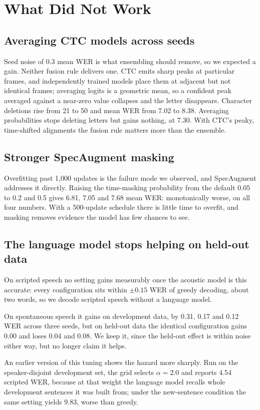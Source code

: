 \section{What Did Not Work}
\label{sec:negative}

\subsection{Averaging CTC models across seeds}


Seed noise of 0.3 mean WER is what ensembling should remove, so we expected a
gain. Neither fusion rule delivers one. CTC emits sharp peaks at particular
frames, and independently trained models place them at adjacent but not
identical frames; averaging logits is a geometric mean, so a confident peak
averaged against a near-zero value collapses and the letter disappears.
Character deletions rise from 21 to 50 and mean WER from 7.02 to 8.38.
Averaging probabilities stops deleting letters but gains nothing, at 7.30. With
CTC's peaky, time-shifted alignments the fusion rule matters more than the
ensemble.

\subsection{Stronger SpecAugment masking}

Overfitting past 1{,}000 updates is the failure mode we observed, and
SpecAugment \cite{park2019specaugment} addresses it directly. Raising the
time-masking probability from the default 0.05 to 0.2 and 0.5 gives 6.81, 7.05
and 7.68 mean WER: monotonically worse, on all four numbers. With a 500-update
schedule there is little time to overfit, and masking removes evidence the
model has few chances to see.

\subsection{The language model stops helping on held-out data}
\label{sec:lmneg}

On scripted speech no setting gains measurably once the acoustic model is this
accurate: every configuration sits within $\pm0.15$ WER of greedy decoding,
about two words, so we decode scripted speech without a language model.

On spontaneous speech it gains on development data, by 0.31, 0.17 and 0.12 WER
across three seeds, but on held-out data the identical configuration gains 0.00
and loses 0.04 and 0.08. We keep it, since the held-out effect is within noise
either way, but no longer claim it helps.

An earlier version of this tuning shows the hazard more sharply. Run on the
speaker-disjoint development set, the grid selects $\alpha = 2.0$ and reports
4.54 scripted WER, because at that weight the language model recalls whole
development sentences it was built from; under the new-sentence condition the
same setting yields 9.83, worse than greedy.

